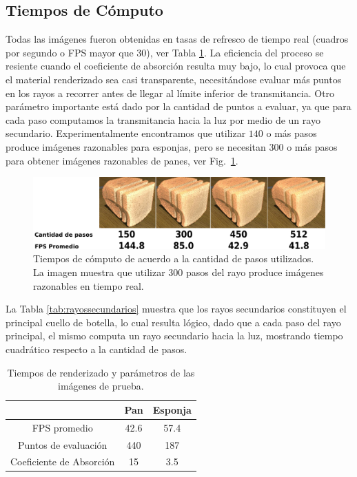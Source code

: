 \subsection*{Tiempos de Cómputo}

Todas las imágenes fueron obtenidas en tasas de refresco de tiempo real (cuadros por segundo o \acrshort{FPS} mayor que $30$), ver Tabla \ref{tab:tiemposrenderizado}.
La eficiencia del proceso se resiente cuando el coeficiente de absorción resulta muy bajo, lo cual provoca que el material renderizado sea casi transparente, necesitándose evaluar más puntos en los rayos a recorrer antes de llegar al límite inferior de transmitancia.
Otro parámetro importante está dado por la cantidad de puntos a evaluar, ya que para cada paso computamos la transmitancia hacia la luz por medio de un rayo secundario.
Experimentalmente encontramos que utilizar $140$ o más pasos produce imágenes razonables para esponjas, pero se necesitan $300$ o más pasos para obtener imágenes razonables de panes, ver Fig.~\ref{fg:stepcount}.


\begin{figure}
  \centerline{\includegraphics[width=12cm]{figures/stepcount}}
  \caption[Tiempos de cómputo de acuerdo a la cantidad de pasos utilizados]{Tiempos de cómputo de acuerdo a la cantidad de pasos utilizados. La imagen muestra que utilizar $300$ pasos del rayo produce imágenes razonables en tiempo real.}
  \label{fg:stepcount}
\end{figure}

La Tabla \ref{tab:rayossecundarios} muestra que los rayos secundarios constituyen el principal cuello de botella, lo cual resulta lógico, dado que a cada paso del rayo principal, el mismo computa un rayo secundario hacia la luz, mostrando tiempo cuadrático respecto a la cantidad de pasos.


\begin{table}[htb]
\centering
\begin{tabular}{|c|c|c|}
\hline &  Pan & Esponja \\
\hline
\hline
 FPS promedio & 42.6 & 57.4\\
\hline
 Puntos de evaluación &  440  & 187 \\
\hline
 Coeficiente de Absorción &  15  & 3.5 \\
\hline
\end{tabular}
\caption{Tiempos de renderizado y parámetros de las imágenes de prueba.}
\label{tab:tiemposrenderizado}
\end{table}

